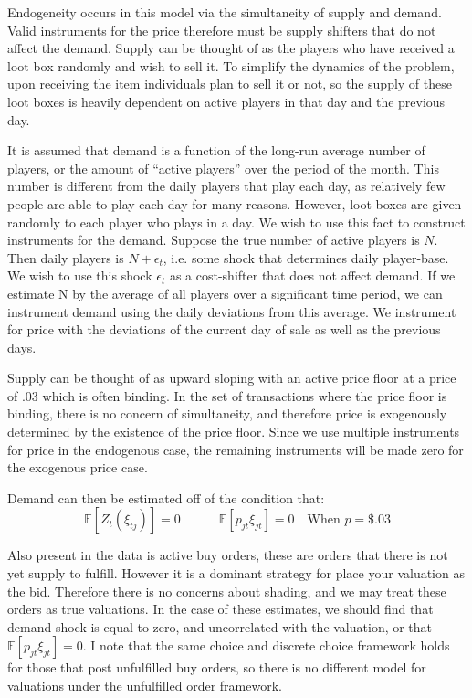 \documentclass[12pt]{paper}
\newcommand{\exV}[1]{\mathbb{E} \left [ #1 \right ]}
\begin{document}
Endogeneity occurs in this model via the simultaneity of supply and
demand. Valid instruments for the price therefore must be supply
shifters that do not affect the demand. Supply can be thought of as
the players who have received a loot box randomly and wish to sell
it. To simplify the dynamics of the problem, upon receiving the item
individuals plan to sell it or not, so the supply of these loot boxes
is heavily dependent on active players in that day and the previous
day. 

It is assumed that demand is a function of the long-run average number
of players, or the amount of ``active players'' over the period of the
month. This number is different from the daily players that play each
day, as relatively few people are able to play each day for many
reasons. However, loot boxes are given randomly to each player who
plays in a day. We wish to use this fact to construct instruments for
the demand. Suppose the true number of active players is $N$. Then daily
players is $N + \epsilon_t$, i.e. some shock that determines daily
player-base. We wish to use this shock $\epsilon_t$ as a cost-shifter that
does not affect demand. If we estimate N by the average of all players
over a significant time period, we can instrument demand using the
daily deviations from this average. We instrument for price with the
deviations of the current day of sale as well as the previous days.


Supply can be thought of as upward sloping with an active price floor
at a price of $.03$ which is often binding. In the set of transactions
where the price floor is binding, there is no concern of simultaneity,
and therefore price is exogenously determined by the existence of the
price floor. Since we use multiple instruments for price in the
endogenous case, the remaining instruments will be made zero for the
exogenous price case. 

Demand can then be estimated off of the condition that:
\begin{equation*}
  \exV{Z_t (\xi_{tj})} = 0 \quad \quad \quad \exV{ p_{jt} \xi_{jt} } = 0 \quad \text{When } p = \$.03
\end{equation*}

Also present in the data is active buy orders, these are orders
that there is not yet supply to fulfill. However it is a dominant
strategy for place your valuation as the bid. Therefore there is no
concerns about shading, and we may treat these orders as true
valuations. In the case of these estimates, we should find that demand
shock is equal to zero, and uncorrelated with the valuation, or that
$\exV{p_{jt}\xi_{jt}} = 0$. I note that the same choice and discrete
choice framework holds for those that post unfulfilled buy orders, so
there is no different model for valuations under the unfulfilled order
framework. 
\end{document}
